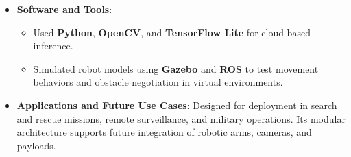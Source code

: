 \documentclass[letterpaper,10pt]{article}
\begin{document}
{\begin{itemize}
\begin{itemize}
        \item Implemented intelligent route optimization and object tagging for dynamic mission support.
    \end{itemize}
    \item \textbf{Software and Tools}:
    \begin{itemize}
        \item Used \textbf{Python}, \textbf{OpenCV}, and \textbf{TensorFlow Lite} for cloud-based inference.
        \item Simulated robot models using \textbf{Gazebo} and \textbf{ROS} to test movement behaviors and obstacle negotiation in virtual environments.
    \end{itemize}
    \item \textbf{Applications and Future Use Cases}: Designed for deployment in search and rescue missions, remote surveillance, and military operations. Its modular architecture supports future integration of robotic arms, cameras, and payloads.
\end{itemize}
}
\end{document}
